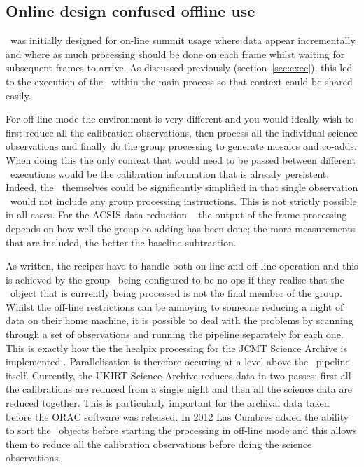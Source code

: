 \documentclass[final,authoryear,5p,times,twocolumn]{elsarticle}
\begin{document}
\subsection{Online design confused offline use}
\label{sec:onvoff}

\oracdr\ was initially designed for on-line summit usage where data
appear incrementally and where as much processing should be done on
each frame whilst waiting for subsequent frames to arrive. As
discussed previously (section~\ref{sec:exec}), this led to the
execution of the \recipe\ within the main process so that context
could be shared easily.

For off-line mode the environment is very different and you would
ideally wish to first reduce all the calibration observations, then
process all the individual science observations and finally do the
group processing to generate mosaics and co-adds. When doing this the
only context that would need to be passed between different \recipe\
executions would be the calibration information that is already
persistent. Indeed, the \recipes\ themselves could be significantly
simplified in that single observation \recipes\ would not include any
group processing instructions. This is not strictly possible in all
cases. For the ACSIS data reduction \recipes\ \citep{JennessACSISDR}
the output of the frame processing depends on how well the group
co-adding has been done; the more measurements that are included, the
better the baseline subtraction.

As written, the recipes have to handle both on-line and off-line
operation and this is achieved by the group \primitives\ being
configured to be no-ops if they realise that the \Frame\ object that
is currently being processed is not the final member of the group.
Whilst the off-line restrictions can be annoying to someone reducing a
night of data on their home machine, it is possible to deal with the
problems by scanning through a set of observations and running the
pipeline separately for each one. This is exactly how the the healpix
processing for the JCMT Science Archive is implemented
\citep{2014SPIE9152-93}. Parallelisation is therefore occuring at a
level above the \oracdr\ pipeline itself. Currently, the UKIRT Science
Archive \citep{2014ASPC..485..143B} reduces data in two passes: first
all the calibrations are reduced from a single night and then all the
science data are reduced together. This is particularly important for
the archival data taken before the ORAC software was released.
In 2012 Las Cumbres added the ability to sort the \Group\ objects
before starting the processing in off-line mode and this allows them to
reduce all the calibration observations before doing the science
observations.
\end{document}
